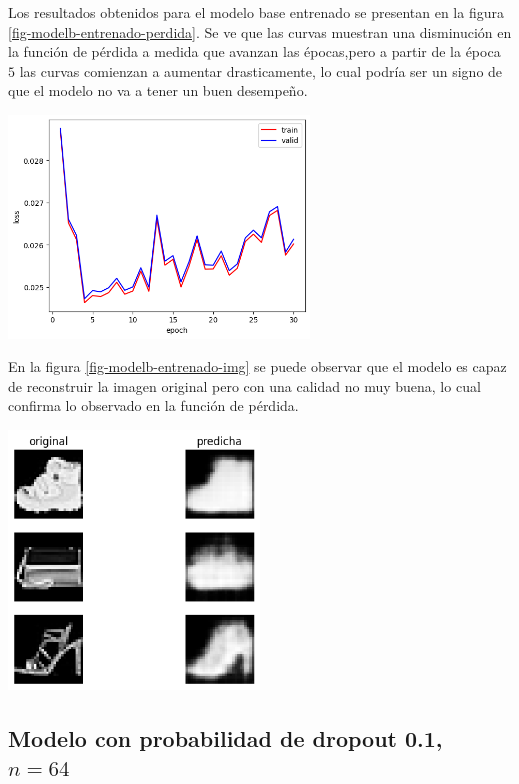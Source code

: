 \documentclass[aps,prl,reprint,groupedaddress]{revtex4-2}
\newenvironment{Figura}
  {\par\medskip\noindent\minipage{\linewidth}}
  {\endminipage\par\medskip}
\begin{document}
Los resultados obtenidos para el modelo base entrenado se presentan en la figura
\ref{fig-modelb-entrenado-perdida}. Se ve que las curvas muestran una 
disminución en la función de pérdida a medida que avanzan las épocas,pero a 
partir de la época $5$ las curvas comienzan a aumentar drasticamente, lo cual
podría ser un signo de que el modelo no va a tener un buen desempeño.
\begin{Figura}
  \centering
  \includegraphics[width=0.60\textwidth]{figs1/modelo_original.png}
  \label{fig-modelb-entrenado-perdida}
\end{Figura}

En la figura \ref{fig-modelb-entrenado-img} se puede observar que el 
modelo es capaz de reconstruir la imagen original pero con una calidad no muy
buena, lo cual confirma lo observado en la función de pérdida.
\begin{Figura}
  \centering
  \includegraphics[width=0.5\textwidth]{figs1/test_modelo_original.png}
  \label{fig-modelb-entrenado-img}
\end{Figura}

\subsection{Modelo con probabilidad de dropout 0.1, $n=64$}
\end{document}
